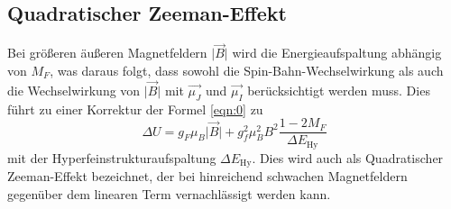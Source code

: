 \subsection{Quadratischer Zeeman-Effekt}
Bei größeren äußeren Magnetfeldern $\lvert \vec{B} \rvert$ wird die Energieaufspaltung abhängig von $M_F$, was daraus folgt, dass sowohl die Spin-Bahn-Wechselwirkung als auch die Wechselwirkung von $\lvert \vec{B} \rvert$ mit $\vec{ \mu_J}$ und $\vec{ \mu_I}$ berücksichtigt werden muss.
Dies führt zu einer Korrektur der Formel \eqref{eqn:0} zu
\begin{equation}
  \label{eqn:zee}
  \Delta U = g_F \mu_B \lvert \vec{B} \rvert + g_f^2 \mu_B ^2 B^2 \frac{1 - 2 M_F}{\Delta E_\text{Hy}}
\end{equation}
mit der Hyperfeinstrukturaufspaltung $\Delta E_\text{Hy}$.
Dies wird auch als Quadratischer Zeeman-Effekt bezeichnet, der bei hinreichend schwachen Magnetfeldern gegenüber dem linearen Term vernachlässigt werden kann.



